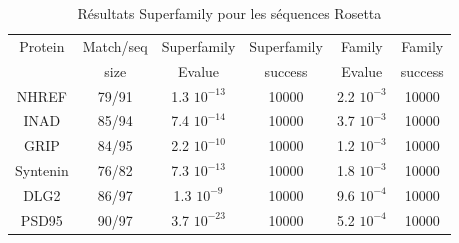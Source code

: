\begin{table}[h]

  \begin{tabular}{cccccc}
    
    \toprule
    Protein & Match/seq & Superfamily & Superfamily & Family & Family \\
            & size      & Evalue      & success     & Evalue & success\\
    \cmidrule{1-6}
    NHREF    & 79/91   &    1.3 $10^{-13}$ & 10000 & 2.2 $10^{-3}$ & 10000 \\
    INAD     & 85/94   &    7.4 $10^{-14}$ & 10000 & 3.7 $10^{-3}$ & 10000 \\
    GRIP     & 84/95   &    2.2 $10^{-10}$ & 10000 & 1.2 $10^{-3}$ & 10000 \\
    Syntenin & 76/82   &    7.3 $10^{-13}$ & 10000 & 1.8 $10^{-3}$ & 10000 \\
    DLG2     & 86/97   &    1.3 $10^{-9}$  & 10000 & 9.6 $10^{-4}$ & 10000 \\
    PSD95    & 90/97   &    3.7 $10^{-23}$ & 10000 & 5.2 $10^{-4}$ & 10000 \\
    \bottomrule        
  \end{tabular}   
  \caption{Résultats Superfamily pour les séquences Rosetta}   
  \label{tab:superfamily_bestRE}       
\end{table}


